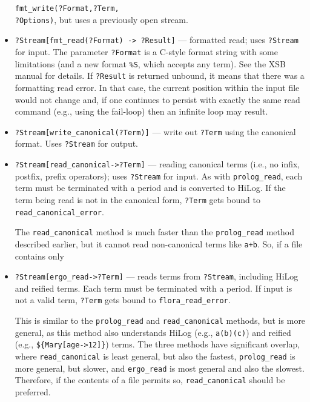 \documentclass[11pt]{article}
\newcommand{\ERGO}{\mbox{\smaller{\ensuremath{\cal{E}}\smaller{{\sc{RGO}}}}}\xspace}
\newcommand{\FLSYSTEM}{\ERGO}
\begin{document}
\begin{itemize}
  \texttt{fmt\_write(?Format,?Term,\\?Options)}, but uses a previously open
  stream.
\item {\tt ?Stream[fmt\_read(?Format) -> ?Result]}  ---  formatted read;
  uses {\tt ?Stream} for input. The parameter
  \texttt{?Format} is a C-style format string
  with some limitations (and a new format \texttt{\%S}, which accepts any
  term). See the XSB manual for details. If \texttt{?Result} is returned
  unbound, it means that there was a formatting read error. In that case,
  the current position within the input file would not change and, if one
  continues to persist with exactly the same read command (e.g., using the
  fail-loop) then an infinite loop may result.
\item {\tt ?Stream[write\_canonical(?Term)]} --- write out \texttt{?Term}
  using the canonical format. 
  Uses {\tt ?Stream} for output.
\item {\tt ?Stream[read\_canonical->?Term]} --- reading canonical terms
  (i.e., no infix, postfix, prefix operators); uses {\tt ?Stream} for
  input. As with \texttt{prolog\_read}, each term must be terminated with a
  period and 
  is converted to HiLog.
  If the term being read
  is not in the canonical form, \texttt{?Term} gets bound to
  \texttt{read\_canonical\_error}.

  The \texttt{read\_canonical} method is much faster than the
  \texttt{prolog\_read} method described earlier, but it cannot read
  non-canonical terms like \texttt{a+b}. So, if a file contains only
\item
    \texttt{?Stream[ergo\_read->?Term]} 
  --- reads \FLSYSTEM terms from \texttt{?Stream}, including HiLog and
  reified terms. Each term must be terminated with a period. If input is
  not a valid \FLSYSTEM term, \texttt{?Term} gets bound to
  \texttt{flora\_read\_error}.  

  This is similar to the \texttt{prolog\_read} and \texttt{read\_canonical}   
  methods, but is more general, as this method also understands HiLog
  (e.g., \texttt{a(b)(c)}) and reified (e.g., \texttt{\$\{Mary[age->12]\}})
  terms.  The three methods have significant overlap, where
  \texttt{read\_canonical} is least general, but also the fastest,
  \texttt{prolog\_read} is more general, but slower, and
  \texttt{ergo\_read}
  is most general and also the slowest. Therefore, if the contents of a
  file permits so, \texttt{read\_canonical} should be preferred.


\end{itemize}
\end{document}

